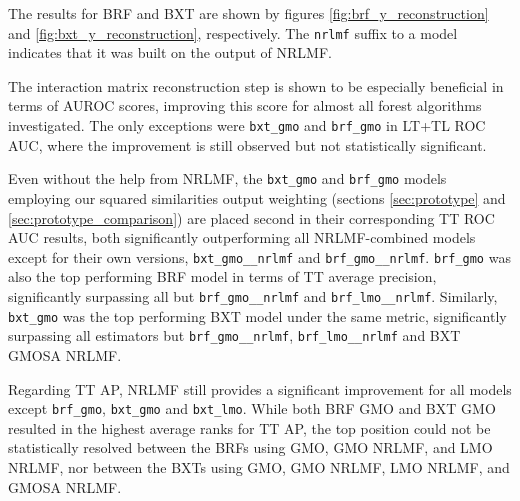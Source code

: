 The results for BRF and BXT are shown by figures \ref{fig:brf_y_reconstruction} and \ref{fig:bxt_y_reconstruction}, respectively. The \texttt{nrlmf} suffix to a model indicates that it was built on the output of NRLMF.

The interaction matrix reconstruction step is shown to be especially beneficial in terms of AUROC scores, improving this score for almost all forest algorithms investigated. The only exceptions were \texttt{bxt\_gmo} and \texttt{brf\_gmo} in LT+TL ROC AUC, where the improvement is still observed but not statistically significant.
%
%

Even without the help from NRLMF, the \texttt{bxt\_gmo} and \texttt{brf\_gmo} models employing our squared similarities output weighting (sections \autoref{sec:prototype} and \autoref{sec:prototype_comparison}) are placed second in their corresponding TT ROC AUC results, both significantly outperforming all NRLMF-combined models except for their own versions, \texttt{bxt\_gmo\_\_nrlmf} and \texttt{brf\_gmo\_\_nrlmf}. %
\texttt{brf\_gmo} was also the top performing BRF model in terms of TT average precision, significantly surpassing all but \texttt{brf\_gmo\_\_nrlmf} and \texttt{brf\_lmo\_\_nrlmf}.
Similarly, \texttt{bxt\_gmo} was the top performing BXT model under the same metric, significantly surpassing all estimators but \texttt{brf\_gmo\_\_nrlmf}, \texttt{brf\_lmo\_\_nrlmf} and BXT GMOSA NRLMF.

Regarding TT AP, NRLMF still provides a significant improvement for all models except \texttt{brf\_gmo}, \texttt{bxt\_gmo} and \texttt{bxt\_lmo}. While both BRF GMO and BXT GMO resulted in the highest average ranks for TT AP, the top position could not be statistically resolved between the BRFs using GMO, GMO NRLMF, and LMO NRLMF, nor between the BXTs using GMO, GMO NRLMF, LMO NRLMF, and GMOSA NRLMF.

